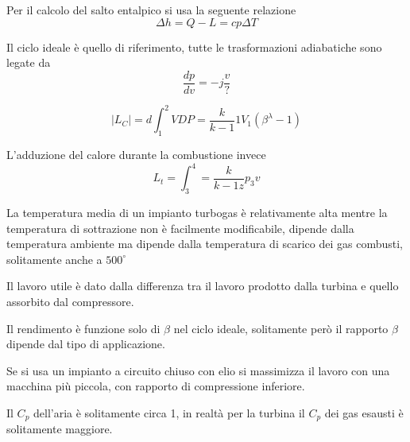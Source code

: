 Per il calcolo del salto entalpico si usa la seguente relazione
$$
\Delta h = Q - L = cp\Delta T
$$


Il ciclo ideale è quello di riferimento, tutte le trasformazioni adiabatiche
sono legate da
$$
\frac{dp}{dv} = -j \frac{v}{?}
$$

$$
|L_C|= d\int_1^2 VDP = \frac{k}{k-1}1V_1(\beta^\lambda
-1)
$$

L'adduzione del calore durante la combustione invece
$$
L_t = \int_3^4 = \frac{k}{k-1z}p_3v
$$

La temperatura media di un impianto turbogas è relativamente alta mentre la
temperatura di sottrazione non è facilmente modificabile, dipende dalla
temperatura ambiente ma dipende dalla temperatura di scarico dei gas combusti,
solitamente anche a $500^\circ$


Il lavoro utile è dato dalla differenza tra il lavoro prodotto dalla turbina e
quello assorbito dal compressore.

Il rendimento è funzione solo di $\beta$ nel ciclo ideale, solitamente però il
rapporto $\beta$ dipende dal tipo di applicazione.

Se si usa un impianto a circuito chiuso con elio si massimizza il lavoro con
una macchina più piccola, con rapporto di compressione inferiore.

Il $C_p$ dell'aria è solitamente circa 1, in realtà per la turbina il $C_p$ dei
gas esausti è solitamente maggiore.

